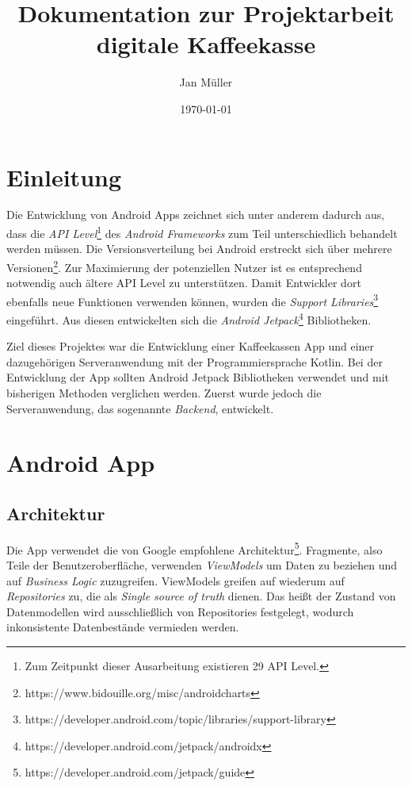 \documentclass[a4paper, 11pt]{article}
\title{Dokumentation zur Projektarbeit digitale Kaffeekasse}
\author{Jan Müller}
\date{\today}
\begin{document}
\maketitle

\section{Einleitung}
\label{sec:intro}
Die Entwicklung von Android Apps zeichnet sich unter anderem dadurch aus, dass die \textit{API Level}\footnote{Zum Zeitpunkt dieser Ausarbeitung existieren 29 API Level.} des \textit{Android Frameworks} zum Teil unterschiedlich behandelt werden müssen.
Die Versionsverteilung bei Android erstreckt sich über mehrere Versionen\footnote{https://www.bidouille.org/misc/androidcharts}.
Zur Maximierung der potenziellen Nutzer ist es entsprechend notwendig auch ältere API Level zu unterstützen.
Damit Entwickler dort ebenfalls neue Funktionen verwenden können, wurden die \textit{Support Libraries}\footnote{https://developer.android.com/topic/libraries/support-library} eingeführt.
Aus diesen entwickelten sich die \textit{Android Jetpack}\footnote{https://developer.android.com/jetpack/androidx} Bibliotheken.

Ziel dieses Projektes war die Entwicklung einer Kaffeekassen App und einer dazugehörigen Serveranwendung mit der Programmiersprache Kotlin.
Bei der Entwicklung der App sollten Android Jetpack Bibliotheken verwendet und mit bisherigen Methoden verglichen werden.
Zuerst wurde jedoch die Serveranwendung, das sogenannte \textit{Backend}, entwickelt.

\section{Android App}
\label{sec:app}

\subsection{Architektur}
\label{subsec:app:architecture}
Die App verwendet die von Google empfohlene Architektur\footnote{https://developer.android.com/jetpack/guide}.
Fragmente, also Teile der Benutzeroberfläche, verwenden \textit{ViewModels} um Daten zu beziehen und auf \textit{Business Logic} zuzugreifen.
ViewModels greifen auf wiederum auf \textit{Repositories} zu, die als \textit{Single source of truth} dienen.
Das heißt der Zustand von Datenmodellen wird ausschließlich von Repositories festgelegt, wodurch inkonsistente Datenbestände vermieden werden.
\end{document}
